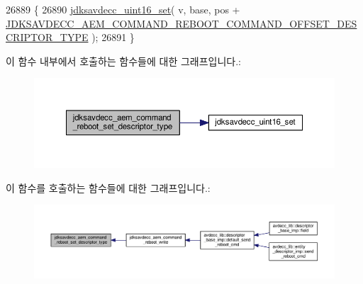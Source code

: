 \begin{DoxyCode}
26889 \{
26890     \hyperlink{group__endian_ga14b9eeadc05f94334096c127c955a60b}{jdksavdecc\_uint16\_set}( v, base, pos + 
      \hyperlink{group__command__reboot_gaccba5ac78eab3d96a48416a0ac9806a1}{JDKSAVDECC\_AEM\_COMMAND\_REBOOT\_COMMAND\_OFFSET\_DESCRIPTOR\_TYPE}
       );
26891 \}
\end{DoxyCode}


이 함수 내부에서 호출하는 함수들에 대한 그래프입니다.\+:
\nopagebreak
\begin{figure}[H]
\begin{center}
\leavevmode
\includegraphics[width=350pt]{group__command__reboot_gaaa29b5bdf032a6326fc121ddb06ab0bd_cgraph}
\end{center}
\end{figure}




이 함수를 호출하는 함수들에 대한 그래프입니다.\+:
\nopagebreak
\begin{figure}[H]
\begin{center}
\leavevmode
\includegraphics[width=350pt]{group__command__reboot_gaaa29b5bdf032a6326fc121ddb06ab0bd_icgraph}
\end{center}
\end{figure}



